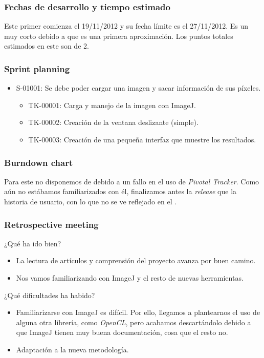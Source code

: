 \subsubsection*{Fechas de desarrollo y tiempo estimado}
Este primer \sprint{} comienza el 19/11/2012 y su fecha límite es el 27/11/2012. Es un \sprint{} muy corto debido a que es una primera aproximación. Los puntos totales estimados en este \sprint{} son de 2.

\subsubsection*{Sprint planning}
\begin{itemize}
\item  S-01001: Se debe poder cargar una imagen y sacar información de sus píxeles.
	\begin{itemize}
	\item TK-00001: Carga y manejo de la imagen con ImageJ.
	\item TK-00002: Creación de la ventana deslizante (simple).
	\item TK-00003: Creación de una pequeña interfaz que muestre los resultados.
	\end{itemize}
\end{itemize}

\subsubsection*{Burndown chart}
Para este \sprint{} no disponemos de \burndownchart{} debido a un fallo en el uso de \textit{Pivotal Tracker}. Como aún no estábamos familiarizados con él, finalizamos antes la \textit{release} que la historia de usuario, con lo que no se ve reflejado en el \burndownchart{}.

\subsubsection*{Retrospective meeting}
¿Qué ha ido bien?
\begin{itemize}
 \item La lectura de artículos y comprensión del proyecto avanza por buen camino.
 \item Nos vamos familiarizando con ImageJ y el resto de nuevas herramientas.
\end{itemize}

¿Qué dificultades ha habido?
\begin{itemize}
 \item Familiarizarse con ImageJ es difícil. Por ello, llegamos a plantearnos el uso de alguna otra librería, como \textit{OpenCL}, pero acabamos descartándolo debido a que ImageJ tienen muy buena documentación, cosa que el resto no.
 \item Adaptación a la nueva metodología.
\end{itemize}


